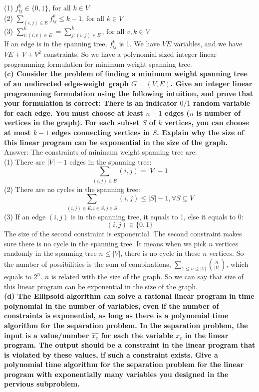 \documentclass{article}
\begin{document}
(1) $f_{ij}^{k}\in \{{0, 1}\}$, for all $k\in V$\\ \newline
(2) $\sum_{(i,j)\in E}f_{ij}^{k} \leq k - 1$, for all $k\in V$\\ \newline
(3) $\sum_{i: (i,v)\in E}^{k} = \sum_{j:(v, j)\in E}^{k}$, for all $v, k\in V$ \\ \newline
If an edge is in the spanning tree, $f_{ij}^{k}$ is 1. We have $VE$ variables, and we have $VE + V + V^2$ constraints. So we have a polynomial sized integer linear programming formulation for minimum weight spanning tree.\\ \newline
\textbf{(c) Consider the problem of finding a minimum weight spanning tree of an undirected edge-weight graph $G = (V, E)$. Give an integer linear programming formulation using the following intuition, and prove that your formulation is correct: There is an indicator $0/1$ random variable for each edge. You must choose at least $n - 1$ edges ($n$ is number of vertices in the graph). For each subset $S$ of $k$ vertices, you can choose at most $k - 1$ edges connecting vertices in $S$. Explain why the size of this linear program can be exponential in the size of the graph.} \\\newline
Answer: The constraints of minimum weight spanning tree are: \\
(1) There are $|V| - 1$ edges in the spanning tree: $$\sum_{(i,j)\in E} (i,j) = |V| - 1$$
(2) There are no cycles in the spanning tree: $$\sum_{(i,j)\in E, i\in S, j\in S}(i, j) \leq |S| - 1, \forall S\subseteq{V}$$ 
(3) If an edge $(i,j)$ is in the spanning tree, it equals to 1, else it equals to 0: $$(i,j)\in \{0,1\}$$
The size of the second constraint is exponential. The second constraint makes sure there is no cycle in the spanning tree. It means when we pick $n$ vertices randomly in the spanning tree $n\leq |V|$, there is no cycle in these $n$ vertices. So the number of possibilities is the sum of combinations, $\sum_{1\leq n \leq |V|}\binom{n}{|V|}$, which equals to $2^n$. $n$ is related with the size of the graph. So we can say that size of this linear program can be exponential in the size of the graph. \\ \newline
\textbf{(d) The Ellipsoid algorithm can solve a rational linear program in time polynomial in the number of variables, even if the number of constraints is exponential, as long as there is a polynomial time algorithm for the separation problem. In the separation problem, the input is a value/number $\hat{x_e}$ for each the variable $x_e$ in the linear program. The output should be a constraint in the linear program that is violated by these values, if such a constraint exists. Give a polynomial time algorithm for the separation problem for the linear program with exponentially many variables you designed in the pervious subproblem.} \\
\end{document}
